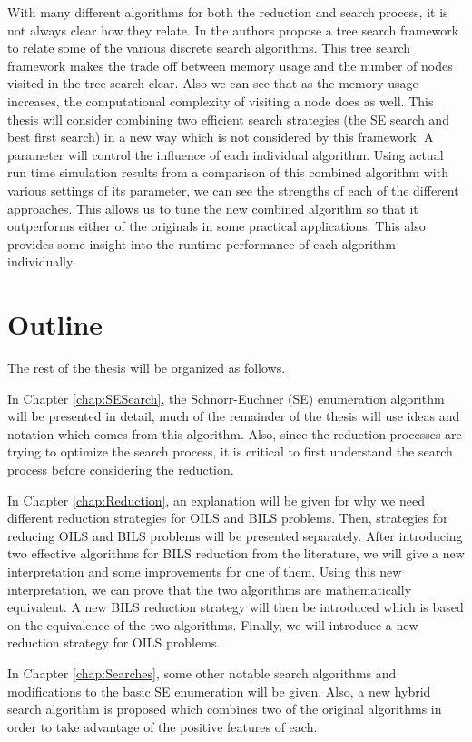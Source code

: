 \documentclass[12pt,Bold,letterpaper]{mcgilletdclass}
\newcommand{\vsp}{\vspace{\baselineskip}}
\begin{document}
With many different algorithms for both the reduction and search process, it is not always clear how they relate. In \cite{MurGDC06} the authors propose a tree search framework to relate some of the various discrete search algorithms. This tree search framework makes the trade off between memory usage and the number of nodes visited in the tree search clear. Also we can see that as the memory usage increases, the computational complexity of visiting a node does as well. This thesis will consider combining two efficient search strategies (the SE search and best first search) in a new way which is not considered by this framework. A parameter will control the influence of each individual algorithm. Using actual run time simulation results from a comparison of this combined algorithm with various settings of its parameter, we can see the strengths of each of the different approaches. This allows us to tune the new combined algorithm so that it outperforms either of the originals in some practical applications. This also provides some insight into the runtime performance of each algorithm individually.

\vsp \section{Outline}
The rest of the thesis will be organized as follows.

In Chapter \ref{chap:SESearch}, the Schnorr-Euchner (SE) enumeration algorithm \cite{SchE94} will be presented in detail, much of the remainder of the thesis will use ideas and notation which comes from this algorithm. Also, since the reduction processes are trying to optimize the search process, it is critical to first understand the search process before considering the reduction.

In Chapter \ref{chap:Reduction}, an explanation will be given for why we need different reduction strategies for OILS and BILS problems. Then, strategies for reducing OILS and BILS problems will be presented separately. After introducing two effective algorithms for BILS reduction from the literature, we will give a new interpretation and some improvements for one of them. Using this new interpretation, we can prove that the two algorithms are mathematically equivalent. A new BILS reduction strategy will then be introduced which is based on the equivalence of the two algorithms. Finally, we will introduce a new reduction strategy for OILS problems.

In Chapter \ref{chap:Searches}, some other notable search algorithms and modifications to the basic SE enumeration will be given. Also, a new hybrid search algorithm is proposed which combines two of the original algorithms in order to take advantage of the positive features of each.
\end{document}

